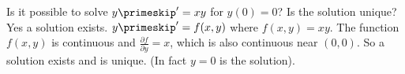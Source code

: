 {Is it possible to solve $y\primeskip' = xy$ for $y(0) = 0$?  Is the solution unique?}
{Yes a solution exists.  $y\primeskip' = f(x,y)$ where $f(x,y) = xy$.  The function
$f(x,y)$ is continuous and 
$\frac{\partial f}{\partial y} = x$, which is also continuous near $(0,0)$.
So a solution exists and is unique.  (In fact $y=0$ is the solution).}